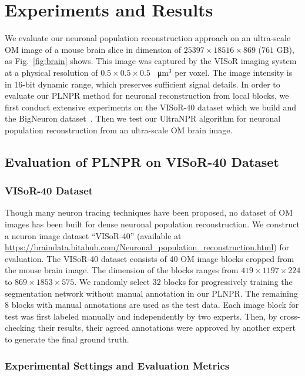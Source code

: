 \section{Experiments and Results}
\label{sec:experiments}

We evaluate our neuronal population reconstruction approach on an ultra-scale OM image of a mouse brain slice in dimension of $25397\times 18516\times 869$ ($761$ GB), as Fig.~\ref{fig:brain} shows.
%
This image was captured by the VISoR imaging system~\cite{Wang2019} at a physical resolution of $0.5 \times0.5 \times 0.5$ \SI{}{\micro\metre}$^3$ per voxel. 
%
The image intensity is in 16-bit dynamic range, which preserves sufficient signal details.
In order to evaluate our PLNPR method for neuronal reconstruction from local blocks, we first conduct extensive experiments on the VISoR-40 dataset which we build and the BigNeuron dataset~\cite{peng2015}. 
%
Then we test our UltraNPR algorithm for neuronal population reconstruction from an ultra-scale OM brain image.

\subsection{Evaluation of PLNPR on VISoR-40 Dataset}
\label{sec:exp_PLNPR_VISoR}

\subsubsection{VISoR-40 Dataset}
Though many neuron tracing techniques have been proposed, no dataset of OM images has been built for dense neuronal population reconstruction.
We construct a neuron image dataset ``VISoR-40'' (available at \url{https://braindata.bitahub.com/Neuronal_population_reconstruction.html}) for evaluation. 
The VISoR-40 dataset consists of 40 OM image blocks cropped from the mouse brain image. The dimension of the blocks ranges from $419 \times1197 \times 224$ to $869 \times1853 \times 575$.
%
We randomly select $32$ blocks for progressively training the segmentation network without manual annotation in our PLNPR.
%
The remaining 8 blocks with manual annotations are used as the test data.
Each image block for test was first labeled manually and independently by two experts. Then, by cross-checking their results, their agreed annotations were approved by another expert to generate the final ground truth.

\subsubsection{Experimental Settings and Evaluation Metrics}


